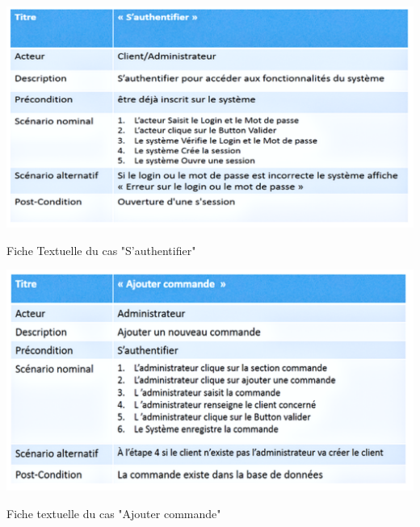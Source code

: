 \documentclass[a4paper, 12pt]{report}
\begin{document}
\begin{table}[H]
	\centering
	\includegraphics{img/fiche/7}
	\caption{Fiche Textuelle du cas "S’authentifier"}
	\label{Tux}
\end{table}
\begin{table}[H]
	\centering
	\includegraphics{img/fiche/8}
	\caption{Fiche textuelle du cas "Ajouter commande"}
	\label{Tux}
\end{table}
\end{document}
